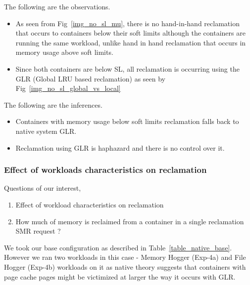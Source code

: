 	  The following are the observations.
	  \begin{itemize}
	    \item As seen from Fig~\ref{img_no_sl_mu}, there is no hand-in-hand reclamation that occurs to containers below their soft 
  limits although the containers are running the same workload, unlike hand in hand reclamation that occurs in memory usage above soft limits.
	    \item Since both containers are below SL, all reclamation is occurring using the GLR (Global LRU based reclamation) as seen by 
  Fig~\ref{img_no_sl_global_vs_local}
	  \end{itemize}

	  The following are the inferences.
	  \begin{itemize}
	    \item Containers with memory usage below soft limits reclamation falls back to native system GLR.
	    \item Reclamation using GLR is haphazard and there is no control over it. 
	  \end{itemize}
   
     \subsubsection{Effect of workloads characteristics on reclamation}
      
	Questions of our interest,
	    \begin{enumerate}
	      \item Effect of workload characteristics on reclamation
	      \item How much of memory is reclaimed from a container in a single reclamation SMR request ?
	    \end{enumerate}
	  
	    We took our base configuration as described in Table~\ref{table_native_base}. However we ran two workloads in this case - Memory 
  Hogger (Exp-4a) and File Hogger (Exp-4b) workloads on it as native theory suggests that containers with page cache pages might be 
  victimized at larger the way it occurs with GLR.	
	  

